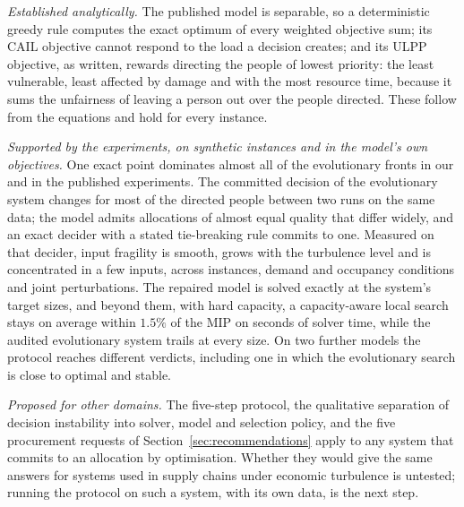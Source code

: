 \documentclass[systems,article,submit,moreauthors,pdftex]{Definitions/mdpi}
\begin{document}
\emph{Established analytically.} The published model is separable, so a deterministic greedy rule
computes the exact optimum of every weighted objective sum; its CAIL objective cannot respond to
the load a decision creates; and its ULPP objective, as written, rewards directing the people of
lowest priority: the least vulnerable, least affected by damage and with the most resource time,
because it sums the unfairness of leaving a person out over the people directed. These follow from the equations and hold for every instance.

\emph{Supported by the experiments, on synthetic instances and in the model's own objectives.} One
exact point dominates almost all of the evolutionary fronts in our and in the published
experiments. The committed decision of the evolutionary system changes for most of the directed
people between two runs on the same data; the model admits allocations of almost equal quality
that differ widely, and an exact decider with a stated tie-breaking rule commits to one. Measured
on that decider, input fragility is smooth, grows with the turbulence level and is concentrated in
a few inputs, across instances, demand and occupancy conditions and joint perturbations. The
repaired model is solved exactly at the system's target sizes, and beyond them, with hard
capacity, a capacity-aware local search stays on average within $1.5\%$ of the MIP on seconds of solver time,
while the audited evolutionary system trails at every size. On two
further models the protocol reaches different verdicts, including one in which the evolutionary
search is close to optimal and stable.

\emph{Proposed for other domains.} The five-step protocol, the qualitative separation of
decision instability into solver, model and selection policy, and the five procurement requests of
Section~\ref{sec:recommendations} apply to any system that commits to an allocation by
optimisation. Whether they would give the same answers for systems used in supply chains under
economic turbulence is untested; running the protocol on such a system, with its own data, is the
next step.

\appendixstart
\appendix
\end{document}
